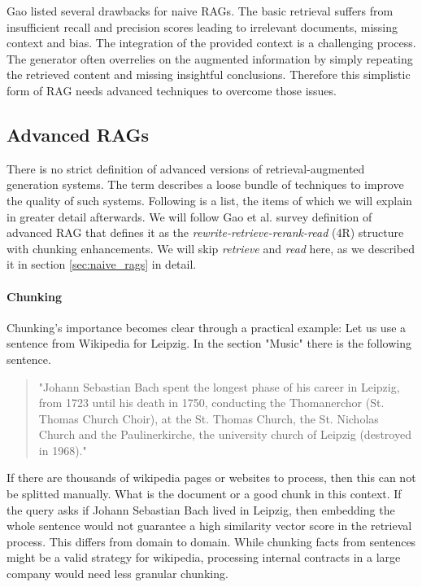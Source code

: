 Gao \cite{Gao.18.12.2023} listed several drawbacks for naive RAGs. The basic retrieval suffers from insufficient recall and precision scores leading to irrelevant documents, missing context and bias. The integration of the provided context is a challenging process. The generator often overrelies on the augmented information by simply repeating the retrieved content and missing insightful conclusions. Therefore this simplistic form of RAG needs advanced techniques to overcome those issues.

\subsection{Advanced RAGs}
\label{sec:advanced_rags}

There is no strict definition of advanced versions of retrieval-augmented generation systems. The term describes a loose bundle of techniques to improve the quality of such systems. Following is a list, the items of which we will explain in greater detail afterwards. We will follow Gao et al. survey definition of advanced RAG that defines it as the \textit{rewrite-retrieve-rerank-read} (4R) structure with chunking enhancements. We will skip \textit{retrieve} and \textit{read} here, as we described it in section \ref{sec:naive_rags} in detail.

\paragraph{Chunking}
\label{sec:chunk}
Chunking's importance becomes clear through a practical example: Let us use a sentence from Wikipedia \cite{LeipzigWikipedia.2025} for Leipzig. In the section "Music" there is the following sentence.

\begin{quote}
    "Johann Sebastian Bach spent the longest phase of his career in Leipzig, from 1723 until his death in 1750, conducting the Thomanerchor (St. Thomas Church Choir), at the St. Thomas Church, the St. Nicholas Church and the Paulinerkirche, the university church of Leipzig (destroyed in 1968)."
\end{quote}

If there are thousands of wikipedia pages or websites to process, then this can not be splitted manually. What is the document or a good chunk in this context. If the query asks if Johann Sebastian Bach lived in Leipzig, then embedding the whole sentence would not guarantee a high similarity vector score in the retrieval process. This differs from domain to domain. While chunking facts from sentences might be a valid strategy for wikipedia, processing internal contracts in a large company would need less granular chunking.

